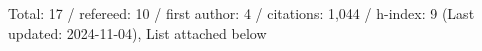 Total: 17 / refereed: 10 / first author: 4 / citations: 1,044 / h-index: 9 (Last updated: 2024-11-04), List attached below